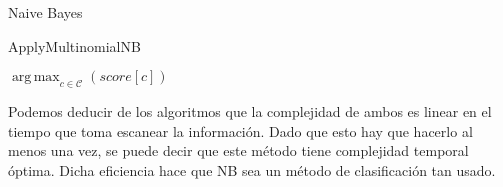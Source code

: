 \documentclass{llncs}
\DeclareMathOperator*{\argmax}{arg\,max}
\begin{document}
\begin{subsection}{Naive Bayes}
		 \begin{algorithm}
		 	\caption{ApplyMultinomialNB}
		 	\begin{algorithmic}[1]
		 		
		 		\EndFor
		 		\EndFor
		 		\State \textbf{\Return} $\argmax_{c\in \mathcal{C}}(score[c])$
		 	\end{algorithmic}
		 \end{algorithm}
		 
		Podemos deducir de los algoritmos que la complejidad de ambos es linear en el tiempo que toma escanear la informaci\'on. Dado que esto hay que hacerlo al menos una vez, se puede decir que este m\'etodo tiene complejidad temporal \'optima. Dicha eficiencia hace que NB sea un m\'etodo de clasificaci\'on tan usado.
	\end{subsection}
	
\end{document}
